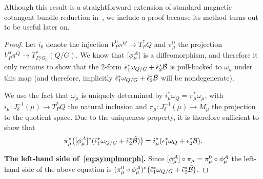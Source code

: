 \documentclass[pdftex]{sigma}
\newcommand{\A}{{\cal A}}
\newcommand{\B}{{\cal B}}
\newcommand{\e}{\epsilon}
\begin{document}
Although this result is a straightforward extension of standard magnetic cotangent bundle reduction in~\cite{MarsdenHamRed}, we include a proof because its method turns out to be useful later on.
\begin{proof}
Let $i_0$ denote the injection $V^0_P\pi^Q\to T^*_PQ$ and $\pi_\mu^0$ the projection $V^0_P\pi^Q\to T^*_{P/G_\mu}(Q/G)$. We know that $[\phi_\mu^\A]$ is a dif\/feomorphism, and therefore it only remains to show that the 2-form $\tilde\e_1^*\omega_{Q/G} + \tilde\e_2^*\tilde\B$ is pull-backed to $\omega_\mu$ under this map (and therefore, implicitly $\tilde\e_1^*\omega_{Q/G} + \tilde\e_2^*\tilde\B$ will be nondegenerate).

We use the fact that $\omega_\mu$ is uniquely determined by $i^*_\mu\omega_Q=\pi^*_\mu\omega_\mu$, with $i_\mu:J^{-1}_\delta(\mu)\to T_P^*Q$ the natural inclusion and $\pi_\mu:J^{-1}_\delta(\mu)\to M_\mu$ the projection to the quotient space. Due to the uniqueness property, it is therefore suf\/f\/icient to show that \begin{gather}\label{eq:symplmorph}
\pi^*_\mu\big([\phi_\mu^\A]^*(\tilde\e_1^*\omega_{Q/G} + \tilde\e_2^*\tilde\B)\big)=i^*_\mu(\e_1^*\omega_Q+\e^*_2\B).
\end{gather}

{\bf The left-hand side of~\eqref{eq:symplmorph}.} Since $[\phi_\mu^\A]\circ\pi_\mu = \pi^0_\mu\circ\phi_\mu^\A$ the left-hand side of the above equation is $(\pi^0_\mu\circ\phi_\mu^\A)^*\big(\tilde\e_1^*\omega_{Q/G} + \tilde\e_2^*\tilde\B\big)$.


\end{proof}
\end{document}
